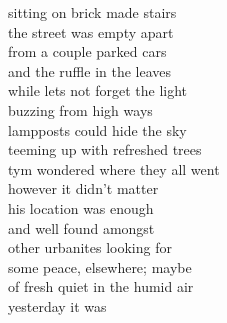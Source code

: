 sitting on brick made stairs\\
the street was empty apart\\
from a couple parked cars\\
and the ruffle in the leaves\\
while lets not forget the light\\

buzzing from high ways\\
lampposts could hide the sky\\
teeming up with refreshed trees\\
tym wondered where they all went\\

however it didn't matter\\
his location was enough\\
and well found amongst\\
other urbanites looking for\\
some peace, elsewhere; maybe\\
of fresh quiet in the humid air\\
yesterday it was
